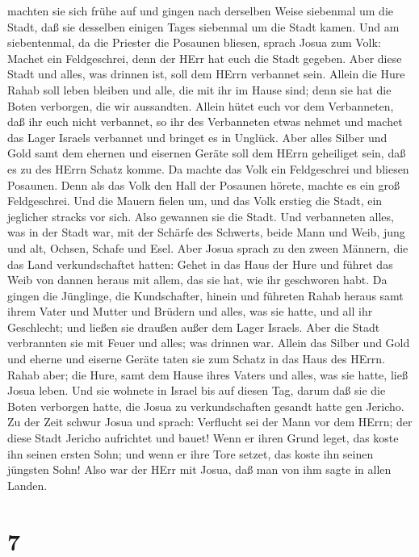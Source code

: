 machten sie sich frühe auf und gingen nach derselben Weise siebenmal um
die Stadt, daß sie desselben einigen Tages siebenmal um die Stadt kamen.
 Und am siebentenmal, da die Priester die Posaunen bliesen,
sprach Josua zum Volk: Machet ein Feldgeschrei, denn der HErr hat euch
die Stadt gegeben.  Aber diese Stadt und alles, was drinnen
ist, soll dem HErrn verbannet sein. Allein die Hure Rahab soll leben
bleiben und alle, die mit ihr im Hause sind; denn sie hat die Boten
verborgen, die wir aussandten.  Allein hütet euch vor dem
Verbanneten, daß ihr euch nicht verbannet, so ihr des Verbanneten etwas
nehmet und machet das Lager Israels verbannet und bringet es in Unglück.
 Aber alles Silber und Gold samt dem ehernen und eisernen
Geräte soll dem HErrn geheiliget sein, daß es zu des HErrn Schatz komme.
 Da machte das Volk ein Feldgeschrei und bliesen Posaunen.
Denn als das Volk den Hall der Posaunen hörete, machte es ein groß
Feldgeschrei. Und die Mauern fielen um, und das Volk erstieg die Stadt,
ein jeglicher stracks vor sich. Also gewannen sie die Stadt.
 Und verbanneten alles, was in der Stadt war, mit der
Schärfe des Schwerts, beide Mann und Weib, jung und alt, Ochsen, Schafe
und Esel.  Aber Josua sprach zu den zween Männern, die das
Land verkundschaftet hatten: Gehet in das Haus der Hure und führet das
Weib von dannen heraus mit allem, das sie hat, wie ihr geschworen habt.
 Da gingen die Jünglinge, die Kundschafter, hinein und
führeten Rahab heraus samt ihrem Vater und Mutter und Brüdern und alles,
was sie hatte, und all ihr Geschlecht; und ließen sie draußen außer dem
Lager Israels.  Aber die Stadt verbrannten sie mit Feuer
und alles; was drinnen war. Allein das Silber und Gold und eherne und
eiserne Geräte taten sie zum Schatz in das Haus des HErrn. 
Rahab aber; die Hure, samt dem Hause ihres Vaters und alles, was sie
hatte, ließ Josua leben. Und sie wohnete in Israel bis auf diesen Tag,
darum daß sie die Boten verborgen hatte, die Josua zu verkundschaften
gesandt hatte gen Jericho.  Zu der Zeit schwur Josua und
sprach: Verflucht sei der Mann vor dem HErrn; der diese Stadt Jericho
aufrichtet und bauet! Wenn er ihren Grund leget, das koste ihn seinen
ersten Sohn; und wenn er ihre Tore setzet, das koste ihn seinen jüngsten
Sohn!  Also war der HErr mit Josua, daß man von ihm sagte
in allen Landen.

\hypertarget{section-6}{%
\section{7}\label{section-6}}

